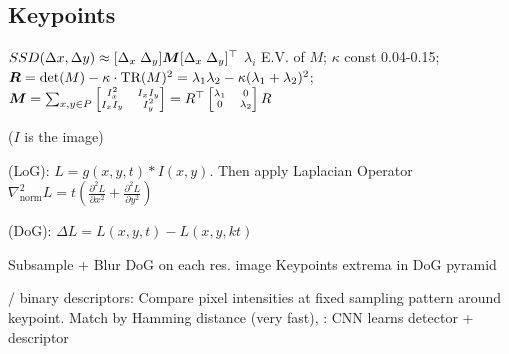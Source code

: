 \subsection{Keypoints}
 $SSD(\Delta x, \Delta y) \approx [\Delta_x \; \Delta_y] \bm{M} [\Delta_x \; \Delta_y]^\top$
$\lambda_i$ E.V. of $M$; $\kappa$ const 0.04-0.15;
$\bm{R} = \det(M) - \kappa \cdot \text{TR}(M)^2 = \lambda_1\lambda_2 - \kappa(\lambda_1 + \lambda_2)^2$;\\
$\bm{M} = \sum_{x, y \in P}
    {\scriptsize
        \begin{bmatrix}
            I_x^2   & I_x I_y \\
            I_x I_y & I_y^2
        \end{bmatrix}
        =
        R^\top
        \begin{bmatrix}
            \lambda_1 & 0         \\
            0         & \lambda_2
        \end{bmatrix}
        R
    }$


 ($I$ is the image)

 (LoG): $L = g(x, y, t) * I(x, y)$.
Then apply Laplacian Operator $\nabla_\text{norm}^2 L = t\left( \frac{\partial^2 L}{\partial x^2} + \frac{\partial^2 L}{\partial y^2} \right)$

 (DoG): $\Delta L = L(x, y, t) - L(x, y, kt)$

  Subsample + Blur  DoG on each res. image  Keypoints extrema in DoG pyramid

 / binary descriptors: Compare pixel intensities at fixed sampling pattern around keypoint. Match by Hamming distance (very fast),
: CNN learns detector + descriptor
